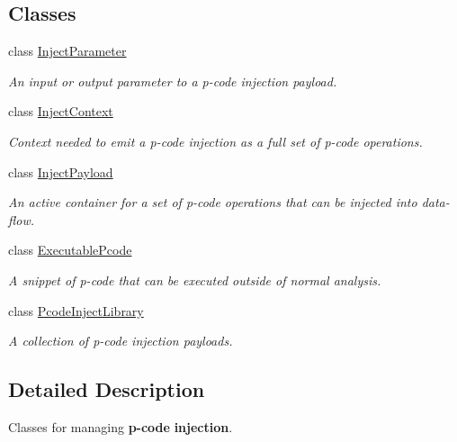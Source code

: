 \subsection*{Classes}
\begin{DoxyCompactItemize}
\item 
class \mbox{\hyperlink{class_inject_parameter}{Inject\+Parameter}}
\begin{DoxyCompactList}\small\item\em An input or output parameter to a p-\/code injection payload. \end{DoxyCompactList}\item 
class \mbox{\hyperlink{class_inject_context}{Inject\+Context}}
\begin{DoxyCompactList}\small\item\em Context needed to emit a p-\/code injection as a full set of p-\/code operations. \end{DoxyCompactList}\item 
class \mbox{\hyperlink{class_inject_payload}{Inject\+Payload}}
\begin{DoxyCompactList}\small\item\em An active container for a set of p-\/code operations that can be injected into data-\/flow. \end{DoxyCompactList}\item 
class \mbox{\hyperlink{class_executable_pcode}{Executable\+Pcode}}
\begin{DoxyCompactList}\small\item\em A snippet of p-\/code that can be executed outside of normal analysis. \end{DoxyCompactList}\item 
class \mbox{\hyperlink{class_pcode_inject_library}{Pcode\+Inject\+Library}}
\begin{DoxyCompactList}\small\item\em A collection of p-\/code injection payloads. \end{DoxyCompactList}\end{DoxyCompactItemize}


\subsection{Detailed Description}
Classes for managing {\bfseries{p-\/code}} {\bfseries{injection}}. 

